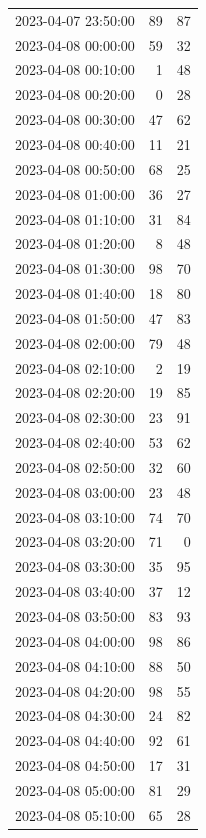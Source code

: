 \documentclass[
  letterpaper,
  DIV=11,
  numbers=noendperiod]{scrartcl}
\begin{document}
\begin{tabular}{lrr}
2023-04-07 23:50:00 &    89 &    87 \\
2023-04-08 00:00:00 &    59 &    32 \\
2023-04-08 00:10:00 &     1 &    48 \\
2023-04-08 00:20:00 &     0 &    28 \\
2023-04-08 00:30:00 &    47 &    62 \\
2023-04-08 00:40:00 &    11 &    21 \\
2023-04-08 00:50:00 &    68 &    25 \\
2023-04-08 01:00:00 &    36 &    27 \\
2023-04-08 01:10:00 &    31 &    84 \\
2023-04-08 01:20:00 &     8 &    48 \\
2023-04-08 01:30:00 &    98 &    70 \\
2023-04-08 01:40:00 &    18 &    80 \\
2023-04-08 01:50:00 &    47 &    83 \\
2023-04-08 02:00:00 &    79 &    48 \\
2023-04-08 02:10:00 &     2 &    19 \\
2023-04-08 02:20:00 &    19 &    85 \\
2023-04-08 02:30:00 &    23 &    91 \\
2023-04-08 02:40:00 &    53 &    62 \\
2023-04-08 02:50:00 &    32 &    60 \\
2023-04-08 03:00:00 &    23 &    48 \\
2023-04-08 03:10:00 &    74 &    70 \\
2023-04-08 03:20:00 &    71 &     0 \\
2023-04-08 03:30:00 &    35 &    95 \\
2023-04-08 03:40:00 &    37 &    12 \\
2023-04-08 03:50:00 &    83 &    93 \\
2023-04-08 04:00:00 &    98 &    86 \\
2023-04-08 04:10:00 &    88 &    50 \\
2023-04-08 04:20:00 &    98 &    55 \\
2023-04-08 04:30:00 &    24 &    82 \\
2023-04-08 04:40:00 &    92 &    61 \\
2023-04-08 04:50:00 &    17 &    31 \\
2023-04-08 05:00:00 &    81 &    29 \\
2023-04-08 05:10:00 &    65 &    28 \\

\end{tabular}
\end{document}
